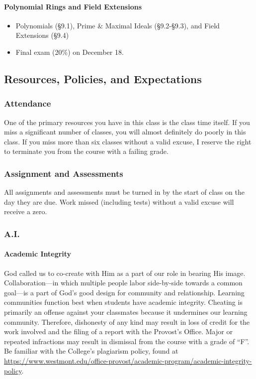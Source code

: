 \documentclass[
  twoside]{article}
\providecommand{\tightlist}{%
  \setlength{\itemsep}{0pt}\setlength{\parskip}{0pt}}
\begin{document}
\paragraph{Polynomial Rings and Field
Extensions}\label{polynomial-rings-and-field-extensions}

\begin{itemize}
\tightlist
\item
  Polynomials (§9.1), Prime \& Maximal Ideals (§9.2-§9.3), and Field
  Extensions (§9.4)
\item
  Final exam (20\%) on December 18.
\end{itemize}

\subsection{Resources, Policies, and
Expectations}\label{resources-policies-and-expectations}

\subsubsection{Attendance}\label{attendance}

One of the primary resources you have in this class is the class time
itself. If you miss a significant number of classes, you will almost
definitely do poorly in this class. If you miss more than six classes
without a valid excuse, I reserve the right to terminate you from the
course with a failing grade.

\subsubsection{Assignment and
Assessments}\label{assignment-and-assessments}

All assignments and assessments must be turned in by the start of class
on the day they are due. Work missed (including tests) without a valid
excuse will receive a zero.

\subsubsection{A.I.}\label{a.i.}

\paragraph{Academic Integrity}\label{academic-integrity}

God called us to co-create with Him as a part of our role in bearing His
image. Collaboration---in which multiple people labor side-by-side
towards a common goal---is a part of God's good design for community and
relationship. Learning communities function best when students have
academic integrity. Cheating is primarily an offense against your
classmates because it undermines our learning community. Therefore,
dishonesty of any kind may result in loss of credit for the work
involved and the filing of a report with the Provost's Office. Major or
repeated infractions may result in dismissal from the course with a
grade of ``F''. Be familiar with the College's plagiarism policy, found
at
\url{https://www.westmont.edu/office-provost/academic-program/academic-integrity-policy}.
\end{document}

